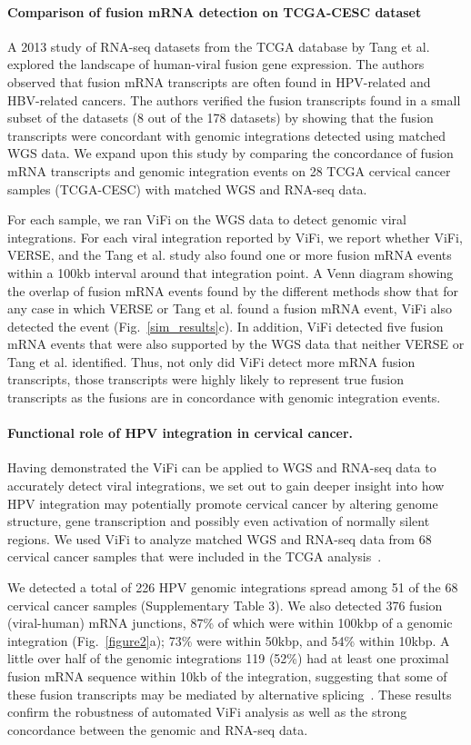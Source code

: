 \documentclass[a4,center,fleqn]{NAR}
\begin{document}
\paragraph{\textbf{Comparison of fusion mRNA detection on TCGA-CESC dataset}}
A 2013 study of RNA-seq datasets from the TCGA database by Tang et
al.~\cite{Tang2013} explored the landscape of human-viral fusion gene
expression.  The authors observed that fusion mRNA transcripts are often
found in HPV-related and HBV-related cancers.  The authors verified
the fusion transcripts found in a small subset of the datasets (8 out
of the 178 datasets) by showing that the fusion transcripts were
concordant with genomic integrations detected using matched WGS data.  We
expand upon this study by comparing the concordance of fusion mRNA
transcripts and genomic integration events on 28 TCGA cervical cancer
samples (TCGA-CESC) with matched WGS and RNA-seq data.

For each sample, we ran ViFi on the WGS data to detect genomic viral
integrations.  For each viral integration reported by ViFi, we report
whether ViFi, VERSE, and the Tang et al. study also found one or more
fusion mRNA events within a 100kb interval around that integration
point.  A Venn diagram showing the overlap of fusion mRNA events found
by the different methods show that for any case in which VERSE or Tang
et al. found a fusion mRNA event, ViFi also detected the event
(Fig.~\ref{sim_results}c).  In addition, ViFi detected five fusion
mRNA events that were also supported by the WGS data that neither
VERSE or Tang et al. identified.  Thus, not only did ViFi detect more
mRNA fusion transcripts, those transcripts were highly likely to
represent true fusion transcripts as the fusions are in concordance
with genomic integration events.

\paragraph{\textbf{Functional role of HPV integration in cervical cancer.}}  Having
demonstrated the ViFi can be applied to WGS and RNA-seq data to
accurately detect viral integrations, we set out to gain deeper
insight into how HPV integration may potentially promote cervical
cancer by altering genome structure, gene transcription and possibly
even activation of normally silent regions. We used ViFi to analyze
matched WGS and RNA-seq data from 68 cervical cancer samples
that were included in the TCGA analysis~\cite{TCGA}.

We detected a total of 226 HPV genomic integrations spread among 51 of
the 68 cervical cancer samples (Supplementary Table 3).  We also detected 376 fusion
(viral-human) mRNA junctions, 87\% of which were within 100kbp of a
genomic integration (Fig.~\ref{figure2}a); 73\% were within
50kbp, and 54\% within 10kbp. A little over half of the genomic
integrations 119 (52\%) had at least one proximal fusion mRNA sequence
within 10kb of the integration, suggesting that some of these fusion
transcripts may be mediated by alternative splicing~\cite{Ziegert2003,Johansson2013}.  
These results confirm the robustness of automated ViFi analysis as well as the strong
concordance between the genomic and RNA-seq data.
\end{document}
